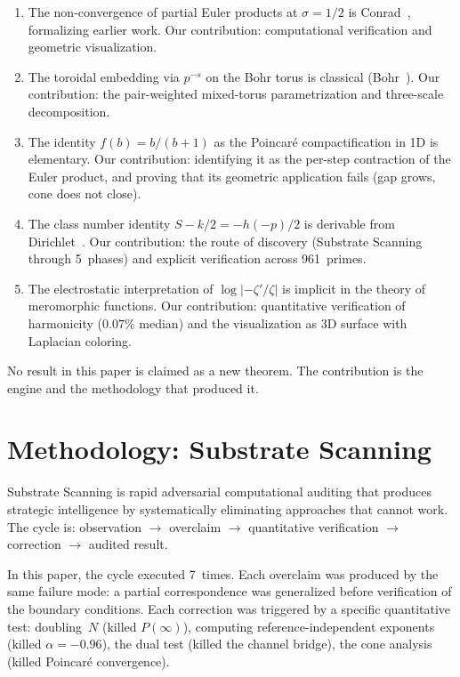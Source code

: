 \documentclass[11pt]{amsart}
\begin{document}
\begin{enumerate}[label=(\alph*)]
\item The non-convergence of partial Euler products at $\sigma = 1/2$ is
  Conrad~\cite{Conrad2005}, formalizing earlier work. Our contribution:
  computational verification and geometric visualization.

\item The toroidal embedding via $p^{-s}$ on the Bohr torus is classical
  (Bohr~\cite{Bohr1924}). Our contribution: the pair-weighted mixed-torus
  parametrization and three-scale decomposition.

\item The identity $f(b) = b/(b+1)$ as the Poincar\'e compactification in
  1D is elementary. Our contribution: identifying it as the per-step
  contraction of the Euler product, and proving that its geometric
  application fails (gap grows, cone does not close).

\item The class number identity $S - k/2 = -h(-p)/2$ is derivable from
  Dirichlet~\cite{Dirichlet1839}. Our contribution: the route of discovery (Substrate
  Scanning through 5~phases) and explicit verification across 961~primes.

\item The electrostatic interpretation of $\log\lvert -\zeta'/\zeta \rvert$
  is implicit in the theory of meromorphic functions. Our contribution:
  quantitative verification of harmonicity ($0.07\%$ median) and the
  visualization as 3D surface with Laplacian coloring.
\end{enumerate}

No result in this paper is claimed as a new theorem. The contribution is the
engine and the methodology that produced it.


\section{Methodology: Substrate Scanning}
\label{sec:methodology}

Substrate Scanning is rapid adversarial computational auditing that produces
strategic intelligence by systematically eliminating approaches that cannot
work. The cycle is: observation $\to$ overclaim $\to$ quantitative
verification $\to$ correction $\to$ audited result.

In this paper, the cycle executed 7~times. Each overclaim was produced by the
same failure mode: a partial correspondence was generalized before
verification of the boundary conditions. Each correction was triggered by a
specific quantitative test: doubling~$N$ (killed $P(\infty)$), computing
reference-independent exponents (killed $\alpha = -0.96$), the dual test
(killed the channel bridge), the cone analysis (killed Poincar\'e
convergence).
\end{document}
